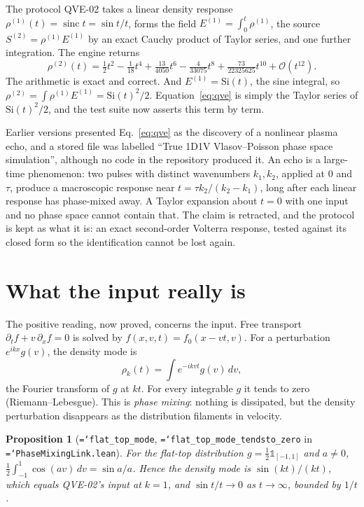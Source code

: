 \documentclass[11pt,a4paper,openany]{book}
\newcommand{\code}[1]{\texttt{\hyphenchar\font=`\-\relax #1}}
\theoremstyle{definition}
\theoremstyle{plain}
\newtheorem{proposition}[theorem]{Proposition}
\begin{document}
The protocol QVE-02 takes a linear density response $\rho^{(1)}(t)=\operatorname{sinc}t
=\sin t/t$, forms the field $E^{(1)}=\int_0^t\rho^{(1)}$, the source $S^{(2)}=\rho^{(1)}E^{(1)}$ by
an exact Cauchy product of Taylor series, and one further integration. The engine returns
\begin{equation}
  \rho^{(2)}(t)=\tfrac12t^2-\tfrac1{18}t^4+\tfrac{13}{4050}t^6-\tfrac4{33075}t^8
  +\tfrac{73}{22325625}t^{10}+\mathcal O(t^{12}).
  \label{eq:qve}
\end{equation}
The arithmetic is exact and correct. And $E^{(1)}=\mathrm{Si}(t)$, the sine integral, so
$\rho^{(2)}=\int\rho^{(1)}E^{(1)}=\mathrm{Si}(t)^2/2$. Equation~\eqref{eq:qve} is simply the Taylor
series of $\mathrm{Si}(t)^2/2$, and the test suite now asserts this term by term.

\begin{lesson}
Earlier versions presented Eq.~\eqref{eq:qve} as the discovery of a nonlinear plasma echo, and a
stored file was labelled ``True 1D1V Vlasov--Poisson phase space simulation'', although no code in
the repository produced it. An echo is a large-time phenomenon: two pulses with distinct
wavenumbers $k_1,k_2$, applied at $0$ and $\tau$, produce a macroscopic response near
$t=\tau k_2/(k_2-k_1)$, long after each linear response has phase-mixed away. A Taylor expansion
about $t=0$ with one input and no phase space cannot contain that. The claim is retracted, and the
protocol is kept as what it is: an exact second-order Volterra response, tested against its
closed form so the identification cannot be lost again.
\end{lesson}

\section{What the input really is}

The positive reading, now proved, concerns the input. Free transport
$\partial_tf+v\,\partial_xf=0$ is solved by $f(x,v,t)=f_0(x-vt,v)$. For a perturbation
$e^{ikx}g(v)$, the density mode is
\[
  \rho_k(t)=\int e^{-ikvt}g(v)\,dv,
\]
the Fourier transform of $g$ at $kt$. For every integrable $g$ it tends to zero
(Riemann--Lebesgue). This is \emph{phase mixing}: nothing is dissipated, but the density
perturbation disappears as the distribution filaments in velocity.

\begin{proposition}[\code{flat\_top\_mode}, \code{flat\_top\_mode\_tendsto\_zero} in
\code{PhaseMixingLink.lean}]
For the flat-top distribution $g=\frac12\mathbb 1_{[-1,1]}$ and $a\ne0$,
$\frac12\int_{-1}^1\cos(av)\,dv=\sin a/a$. Hence the density mode is $\sin(kt)/(kt)$, which
equals QVE-02's input at $k=1$, and $\sin t/t\to0$ as $t\to\infty$, bounded by $1/t$.
\end{proposition}
\end{document}
